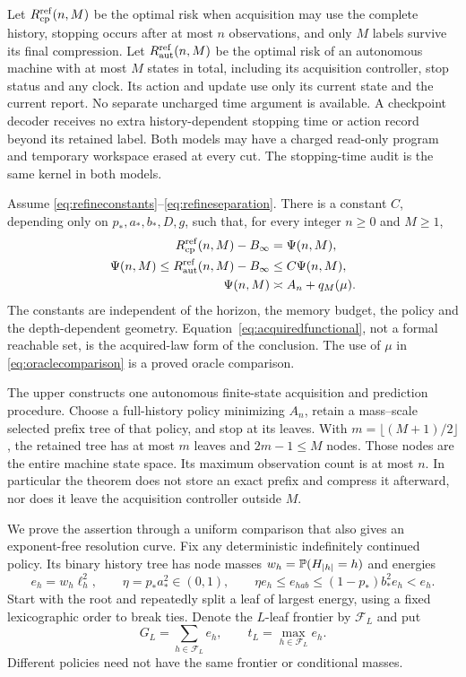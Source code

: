 Let $R_{\rm cp}^{\rm ref}(n,M)$ be the optimal risk when acquisition may use the complete history, stopping occurs after at most $n$ observations, and only $M$ labels survive its final compression. Let $R_{\rm aut}^{\rm ref}(n,M)$ be the optimal risk of an autonomous machine with at most $M$ states in total, including its acquisition controller, stop status and any clock. Its action and update use only its current state and the current report. No separate uncharged time argument is available. A checkpoint decoder receives no extra history-dependent stopping time or action record beyond its retained label. Both models may have a charged read-only program and temporary workspace erased at every cut. The stopping-time audit is the same kernel in both models.

\begin{theorem}\label{thm:autonomous}
Assume \eqref{eq:refineconstants}--\eqref{eq:refineseparation}. There is a constant $C$, depending only on $p_*,a_*,b_*,D,g$, such that, for every integer $n\ge0$ and $M\ge1$,
\begin{align}
 R_{\rm cp}^{\rm ref}(n,M)-B_\infty&=\Psi(n,M),\label{eq:exactadaptivecp}\\
 \Psi(n,M)\le R_{\rm aut}^{\rm ref}(n,M)-B_\infty
 &\le C\Psi(n,M),\label{eq:autonomousmain}\\
 \Psi(n,M)&\asymp A_n+q_M(\mu).\label{eq:oraclecomparison}
\end{align}
The constants are independent of the horizon, the memory budget, the policy and the depth-dependent geometry. Equation~\eqref{eq:acquiredfunctional}, not a formal reachable set, is the acquired-law form of the conclusion. The use of $\mu$ in \eqref{eq:oraclecomparison} is a proved oracle comparison.

The upper constructs one autonomous finite-state acquisition and prediction procedure. Choose a full-history policy minimizing $A_n$, retain a mass--scale selected prefix tree of that policy, and stop at its leaves. With $m=\lfloor(M+1)/2\rfloor$, the retained tree has at most $m$ leaves and $2m-1\le M$ nodes. Those nodes are the entire machine state space. Its maximum observation count is at most $n$. In particular the theorem does not store an exact prefix and compress it afterward, nor does it leave the acquisition controller outside $M$.
\end{theorem}

We prove the assertion through a uniform comparison that also gives an exponent-free resolution curve. Fix any deterministic indefinitely continued policy. Its binary history tree has node masses $w_h=\mathbb P(H_{|h|}=h)$ and energies
\[
 e_h=w_h\ell_h^2,\qquad \eta=p_*a_*^2\in(0,1),\qquad
 \eta e_h\le e_{hab}\le(1-p_*)b_*^2e_h<e_h.
\]
Start with the root and repeatedly split a leaf of largest energy, using a fixed lexicographic order to break ties. Denote the $L$-leaf frontier by $\mathcal F_L$ and put
\begin{equation}\label{eq:frontierprofile}
 G_L=\sum_{h\in\mathcal F_L}e_h,\qquad t_L=\max_{h\in\mathcal F_L}e_h.
\end{equation}
Different policies need not have the same frontier or conditional masses.

